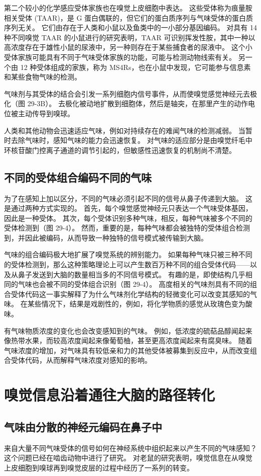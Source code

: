 第二个较小的化学感应受体家族也在嗅觉上皮细胞中表达。 这些受体称为痕量胺相关受体 (TAAR)，是 G 蛋白偶联的，但它们的蛋白质序列与气味受体的蛋白质序列无关。 它们由存在于人类和小鼠以及鱼类中的一小部分基因编码。 对具有 14 种不同嗅觉 TAAR 的小鼠进行的研究表明，TAAR 可识别挥发性胺，其中一种以高浓度存在于雄性小鼠的尿液中，另一种则存在于某些捕食者的尿液中。 这个小受体家族可能具有不同于气味受体家族的功能，可能与检测动物线索有关。 另一个由 12 种受体组成的家族，称为 MS4Rs，也在小鼠中发现，它可能参与信息素和某些食物气味的检测。

气味剂与其受体的结合会引发一系列细胞内信号事件，从而使嗅觉感觉神经元去极化（图 29-3B）。 去极化被动地扩散到细胞体，然后是轴突，在那里产生的动作电位被主动传导到嗅球。

人类和其他动物会迅速适应气味，例如对持续存在的难闻气味的检测减弱。 当暂时去除气味时，感知气味的能力会迅速恢复。 对气味的适应部分是由嗅觉纤毛中环核苷酸门控离子通道的调节引起的，但敏感性迅速恢复的机制尚不清楚。

\subsection{不同的受体组合编码不同的气味}
为了在感知上加以区分，不同的气味必须引起不同的信号从鼻子传递到大脑。 这是通过两种方式实现的。 首先，每个嗅觉感觉神经元只表达一个气味受体基因，因此是一种受体。 其次，每个受体识别多种气味，相反，每种气味被多个不同的受体检测到（图 29-4）。 然而，重要的是，每种气味都会被独特的受体组合检测到，并因此被编码，从而导致一种独特的信号模式被传输到大脑。

气味的组合编码极大地扩展了嗅觉系统的辨别能力。 如果每种气味只被三种不同的受体检测到，那么这种策略理论上可以产生数百万种不同的组合受体代码——以及从鼻子发送到大脑的数量相当多的不同信号模式。 有趣的是，即使结构几乎相同的气味也会被不同的受体组合识别（图 29-4）。 高度相关的气味剂具有不同的组合受体代码这一事实解释了为什么气味剂化学结构的轻微变化可以改变其感知的气味。 在某些情况下，结果是戏剧性的，例如，将化学物质的感觉从玫瑰色变为酸味。

有气味物质浓度的变化也会改变感知到的气味。 例如，低浓度的硫萜品醇闻起来像热带水果，而较高浓度闻起来像葡萄柚，甚至更高浓度闻起来有腐臭味。 随着气味浓度的增加，对气味具有较低亲和力的其他受体被募集到反应中，从而改变组合受体代码，从而解释气味浓度对感知的影响。


\section{嗅觉信息沿着通往大脑的路径转化}
\subsection{气味由分散的神经元编码在鼻子中}
来自大量不同气味受体的信号如何在神经系统中组织起来以产生不同的气味感知？ 这个问题已经在啮齿动物中进行了研究。 对老鼠的研究表明，嗅觉信息在从嗅觉上皮细胞到嗅球再到嗅觉皮层的过程中经历了一系列的转变。

